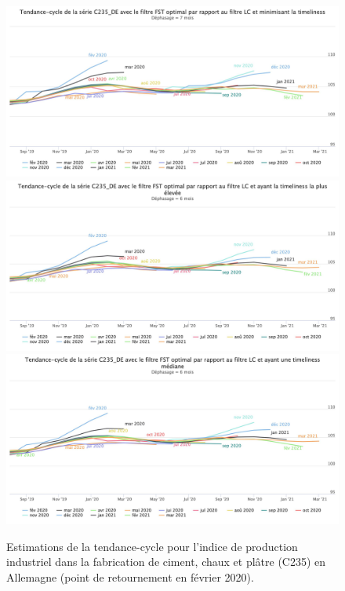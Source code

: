 \documentclass[
  11pt,
  french,
  a4paper]{article}
\newcommand\1{\mathds{1}}
\begin{document}
\begin{figure}[H]

{\centering \includegraphics[width=0.9\linewidth,]{img/simulations/c235_de_fst_lc} \includegraphics[width=0.9\linewidth,]{img/simulations/c235_de_fst_lc_min} \includegraphics[width=0.9\linewidth,]{img/simulations/c235_de_fst_lc_med} 

}

\caption[Estimations de la tendance-cycle pour l'indice de production industriel dans la fabrication de ciment, chaux et plâtre (C235) en Allemagne (point de retournement en février 2020)]{Estimations de la tendance-cycle pour l'indice de production industriel dans la fabrication de ciment, chaux et plâtre (C235) en Allemagne (point de retournement en février 2020).}\label{fig:c235dep3}

\footnotesize
\normalsize\end{figure}
\end{document}

